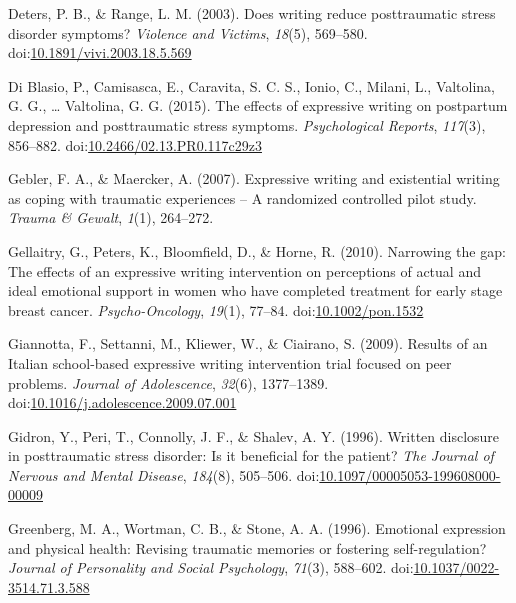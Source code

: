 \documentclass[english,man]{apa6}
\theoremstyle{definition}
\theoremstyle{definition}
\theoremstyle{definition}
\theoremstyle{remark}
\begin{document}
\hypertarget{ref-Deters2003}{}
Deters, P. B., \& Range, L. M. (2003). Does writing reduce posttraumatic
stress disorder symptoms? \emph{Violence and Victims}, \emph{18}(5),
569--580.
doi:\href{https://doi.org/10.1891/vivi.2003.18.5.569}{10.1891/vivi.2003.18.5.569}

\hypertarget{ref-Blasio2015a}{}
Di Blasio, P., Camisasca, E., Caravita, S. C. S., Ionio, C., Milani, L.,
Valtolina, G. G., \ldots{} Valtolina, G. G. (2015). The effects of
expressive writing on postpartum depression and posttraumatic stress
symptoms. \emph{Psychological Reports}, \emph{117}(3), 856--882.
doi:\href{https://doi.org/10.2466/02.13.PR0.117c29z3}{10.2466/02.13.PR0.117c29z3}

\hypertarget{ref-Gebler2007}{}
Gebler, F. A., \& Maercker, A. (2007). Expressive writing and
existential writing as coping with traumatic experiences -- A randomized
controlled pilot study. \emph{Trauma \& Gewalt}, \emph{1}(1), 264--272.

\hypertarget{ref-Gellaitry2010}{}
Gellaitry, G., Peters, K., Bloomfield, D., \& Horne, R. (2010).
Narrowing the gap: The effects of an expressive writing intervention on
perceptions of actual and ideal emotional support in women who have
completed treatment for early stage breast cancer.
\emph{Psycho-Oncology}, \emph{19}(1), 77--84.
doi:\href{https://doi.org/10.1002/pon.1532}{10.1002/pon.1532}

\hypertarget{ref-Giannotta2009}{}
Giannotta, F., Settanni, M., Kliewer, W., \& Ciairano, S. (2009).
Results of an Italian school-based expressive writing intervention trial
focused on peer problems. \emph{Journal of Adolescence}, \emph{32}(6),
1377--1389.
doi:\href{https://doi.org/10.1016/j.adolescence.2009.07.001}{10.1016/j.adolescence.2009.07.001}

\hypertarget{ref-Gidron1996a}{}
Gidron, Y., Peri, T., Connolly, J. F., \& Shalev, A. Y. (1996). Written
disclosure in posttraumatic stress disorder: Is it beneficial for the
patient? \emph{The Journal of Nervous and Mental Disease},
\emph{184}(8), 505--506.
doi:\href{https://doi.org/10.1097/00005053-199608000-00009}{10.1097/00005053-199608000-00009}

\hypertarget{ref-Greenberg1996}{}
Greenberg, M. A., Wortman, C. B., \& Stone, A. A. (1996). Emotional
expression and physical health: Revising traumatic memories or fostering
self-regulation? \emph{Journal of Personality and Social Psychology},
\emph{71}(3), 588--602.
doi:\href{https://doi.org/10.1037/0022-3514.71.3.588}{10.1037/0022-3514.71.3.588}
\end{document}
